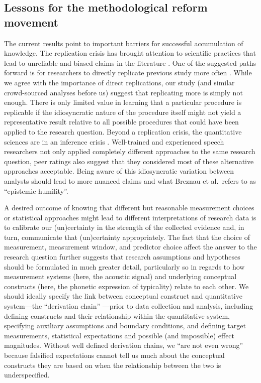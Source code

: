 \documentclass[Review,times,sageh]{sagej}
\begin{document}
\hypertarget{lessons-for-the-methodological-reform-movement}{%
\subsection{Lessons for the methodological reform movement}\label{lessons-for-the-methodological-reform-movement}}

The current results point to important barriers for successful accumulation of knowledge.
The replication crisis has brought attention to scientific practices that lead to unreliable and biased claims in the literature \citep[e.g.,][\citet{fidler2018reproducibility}]{vazire2017quality}.
One of the suggested paths forward is for researchers to directly replicate previous study more often \citep[e.g.,][]{open2015estimating, camerer2018evaluating}.
While we agree with the importance of direct replications, our study (and similar crowd-sourced analyses before us) suggest that replicating more is simply not enough.
There is only limited value in learning that a particular procedure is replicable if the idiosyncratic nature of the procedure itself might not yield a representative result relative to all possible procedures that could have been applied to the research question.
Beyond a replication crisis, the quantitative sciences are in an inference crisis \citep{rotello2015more, starns2019assessing}.
Well-trained and experienced speech researchers not only applied completely different approaches to the same research question, peer ratings also suggest that they considered most of these alternative approaches acceptable.
Being aware of this idiosyncratic variation between analysts should lead to more nuanced claims and what Breznau et al.~refers to as ``epistemic humility''.

A desired outcome of knowing that different but reasonable measurement choices or statistical approaches might lead to different interpretations of research data is to calibrate our (un)certainty in the strength of the collected evidence and, in turn, communicate that (un)certainty appropriately.
The fact that the choice of measurement, measurement window, and predictor choice affect the answer to the research question further suggests that research assumptions and hypotheses should be formulated in much greater detail, particularly so in regards to how measurement systems (here, the acoustic signal) and underlying conceptual constructs (here, the phonetic expression of typicality) relate to each other.
We should ideally specify the link between conceptual construct and quantitative system---the ``derivation chain'' \citep{dubin1970theory, meehl1990summaries}---prior to data collection and analysis, including defining constructs and their relationship within the quantitative system, specifying auxiliary assumptions and boundary conditions, and defining target measurements, statistical expectations and possible (and impossible) effect magnitudes.
Without well defined derivation chains, we ``are not even wrong'' \citep{scheel2022most} because falsified expectations cannot tell us much about the conceptual constructs they are based on when the relationship between the two is underspecified.
\end{document}
